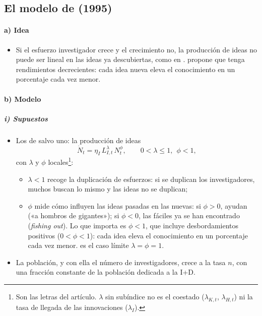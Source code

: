 \documentclass[11pt]{article}
\begin{document}
\subsection{El modelo de  (1995)}\label{sec:jones}

\paragraph{a) Idea}

\begin{itemize}
\item Si el esfuerzo investigador crece y el crecimiento no, la producción de ideas no puede ser lineal en las ideas ya descubiertas, como en . \textcite{Jones1995} propone que tenga rendimientos decrecientes: cada idea nueva eleva el conocimiento en un porcentaje cada vez menor.
\end{itemize}

\paragraph{b) Modelo}

\subparagraph{i) Supuestos}

\begin{itemize}
\item Los de  salvo uno: la producción de ideas
  \begin{equation}
  \dot N_t=\eta_I\,L_{I,t}^{\lambda}\,N_t^{\phi},\qquad 0<\lambda\leq1,\ \ \phi<1,\label{eq:jones-ideas}
  \end{equation}
  con $\lambda$ y $\phi$ locales\footnote{Son las letras del artículo. $\lambda$ sin subíndice no es el coestado ($\lambda_{K,t}$, $\lambda_{H,t}$) ni la tasa de llegada de las innovaciones ($\lambda_I$).}:
  \begin{itemize}
  \item $\lambda<1$ recoge la duplicación de esfuerzos: si se duplican los investigadores, muchos buscan lo mismo y las ideas no se duplican;
  \item $\phi$ mide cómo influyen las ideas pasadas en las nuevas: si $\phi>0$, ayudan («a hombros de gigantes»); si $\phi<0$, las fáciles ya se han encontrado (\emph{fishing out}). Lo que importa es $\phi<1$, que incluye desbordamientos positivos ($0<\phi<1$): cada idea eleva el conocimiento en un porcentaje cada vez menor\nocite{Jones1995}.  es el caso límite $\lambda=\phi=1$.
  \end{itemize}
\item La población, y con ella el número de investigadores, crece a la tasa $n$, con una fracción constante de la población dedicada a la I+D.
\end{itemize}
\end{document}
